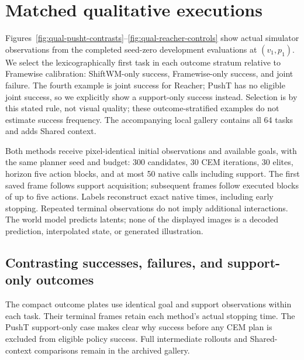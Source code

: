 \FloatBarrier
\section{Matched qualitative executions}
\label{sec:qualitative-rollouts}
Figures~\ref{fig:qual-pusht-contrasts}--\ref{fig:qual-reacher-controls}
show actual simulator observations from the completed seed-zero development
evaluations at $(v_1,p_1)$. We select the lexicographically first task in each
outcome stratum relative to Framewise calibration: ShiftWM-only success,
Framewise-only success, and joint failure. The fourth example is joint success
for Reacher; PushT has no eligible joint success, so we explicitly show a
support-only success instead. Selection is by this stated rule, not visual
quality; these outcome-stratified examples do not estimate success frequency.
The accompanying local gallery contains all 64 tasks and adds Shared context.

Both methods receive pixel-identical initial observations and available goals,
with the same planner seed and budget: 300 candidates, 30 CEM iterations,
30 elites, horizon five action blocks, and at most 50 native calls including
support. The first saved frame follows support acquisition; subsequent frames
follow executed blocks of up to five actions. Labels reconstruct exact native
times, including early stopping. Repeated terminal observations do not imply
additional interactions. The world model predicts latents; none of the displayed
images is a decoded prediction, interpolated state, or generated illustration.




\subsection{Contrasting successes, failures, and support-only outcomes}
The compact outcome plates use identical goal and support observations within
each task. Their terminal frames retain each method's actual stopping time.
The PushT support-only case makes clear why success before any CEM plan is
excluded from eligible policy success. Full intermediate rollouts and
Shared-context comparisons remain in the archived gallery.



\FloatBarrier

